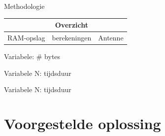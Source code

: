 \documentclass[presentation, bigger]{beamer}
\begin{document}
\begin{frame}{Methodologie}
\begin{tabular}{ p{}  p{} p{}}
     \toprule
     & \multicolumn{1}{c}{Overzicht}  & \\ 
      \toprule
      RAM-opslag & berekeningen & Antenne\\
    \cmidrule(r){1-1}\cmidrule(lr){2-2}\cmidrule(l){3-3}
\end{tabular}      
\begin{minipage}{.33\textwidth}
      \centering
      Variabele: \# bytes\\
       \vspace{0.25cm}
      
    \end{minipage}%
    \begin{minipage}{.33\textwidth}
      \centering
      Variabele N: tijdsduur\\
      \vspace{0.25cm}
      
    \end{minipage}
     \begin{minipage}{.3\textwidth}
      \centering
      Variabele N: tijdsduur\\
      \vspace{0.35cm}
     
    \end{minipage}
\end{frame}
\section{Voorgestelde oplossing}
\end{document}

